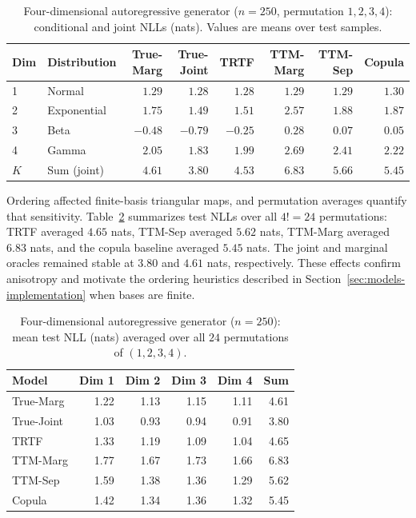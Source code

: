 \documentclass[11pt,a4paper,twoside]{book}\usepackage[]{graphicx}\usepackage[]{xcolor}
\begin{document}
\begin{table}[htbp]
  \centering
  \caption{Four-dimensional autoregressive generator ($n=250$, permutation $1,2,3,4$): conditional and joint NLLs (nats). Values are means over test samples.}
  \label{tab:autoregressive-nll}
  \begin{tabular}{llrrrrrr}
    \hline
    Dim & Distribution & True-Marg & True-Joint & TRTF & TTM-Marg & TTM-Sep & Copula \\
    \hline
    1 & Normal      & $1.29$ & $1.28$ & $1.28$ & $1.29$ & $1.29$ & $1.30$ \\
    2 & Exponential & $1.75$ & $1.49$ & $1.51$ & $2.57$ & $1.88$ & $1.87$ \\
    3 & Beta        & $-0.48$ & $-0.79$ & $-0.25$ & $0.28$ & $0.07$ & $0.05$ \\
    4 & Gamma       & $2.05$ & $1.83$ & $1.99$ & $2.69$ & $2.41$ & $2.22$ \\
    $K$ & Sum (joint) & $4.61$ & $3.80$ & $4.53$ & $6.83$ & $5.66$ & $5.45$ \\
    \hline
  \end{tabular}
\end{table}

Ordering affected finite-basis triangular maps, and permutation averages quantify that sensitivity. Table~\ref{tab:autoregressive-perm} summarizes test NLLs over all $4! = 24$ permutations: TRTF averaged $4.65$ nats, TTM-Sep averaged $5.62$ nats, TTM-Marg averaged $6.83$ nats, and the copula baseline averaged $5.45$ nats. The joint and marginal oracles remained stable at $3.80$ and $4.61$ nats, respectively. These effects confirm anisotropy and motivate the ordering heuristics described in Section~\ref{sec:models-implementation} when bases are finite.

\begin{table}[htbp]
  \centering
  \caption{Four-dimensional autoregressive generator ($n=250$): mean test NLL (nats) averaged over all $24$ permutations of $(1,2,3,4)$.}
  \label{tab:autoregressive-perm}
  \begin{tabular}{lrrrrr}
    \hline
    Model & Dim 1 & Dim 2 & Dim 3 & Dim 4 & Sum \\
    \hline
    True-Marg        & 1.22 & 1.13 & 1.15 & 1.11 & 4.61 \\
    True-Joint       & 1.03 & 0.93 & 0.94 & 0.91 & 3.80 \\
    TRTF               & 1.33 & 1.19 & 1.09 & 1.04 & 4.65 \\
    TTM-Marg           & 1.77 & 1.67 & 1.73 & 1.66 & 6.83 \\
    TTM-Sep            & 1.59 & 1.38 & 1.36 & 1.29 & 5.62 \\
    Copula             & 1.42 & 1.34 & 1.36 & 1.32 & 5.45 \\
    \hline
  \end{tabular}
\end{table}
\end{document}
